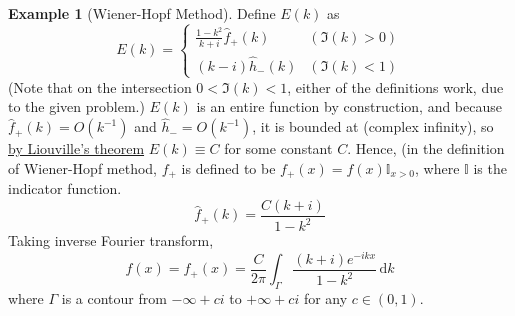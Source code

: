 \documentclass[a4paper, 12pt]{article}
\theoremstyle{definition}
\newtheorem{example}{Example}
\numberwithin{theorem}{section}
\numberwithin{definition}{section}
\numberwithin{exercise}{section}
\numberwithin{remark}{section}
\numberwithin{figure}{section}
\numberwithin{example}{section}
\newcommand{\intd}{\,\text{d}}
\begin{document}
\begin{example}[Wiener-Hopf Method]
    Define $E(k)$ as
    \begin{equation*}
        E(k) = 
        \begin{cases}
            \frac{1-k^2}{k+i} \hat f_{+} (k) & (\Im (k) > 0) \\
            (k-i) \hat h_{-}(k) & (\Im (k) < 1)
        \end{cases}
    \end{equation*}
    (Note that on the intersection $0 < \Im (k) < 1$, either of the definitions work,
    due to the given problem.)
    $E(k)$ is an entire function by construction, and because $\hat f_{+} (k) = O\left( k^{-1} \right)$ and $\hat h_{-} = O\left( k^{-1} \right)$,
    it is bounded at (complex infinity),
    so \ul{by Liouville's theorem} $E(k) \equiv C$ for some constant $C$.
    Hence, (in the definition of Wiener-Hopf method, $f_{+}$ is defined to be $f_{+}(x) = f(x) \mathbb{I}_{x>0}$, where $\mathbb{I}$ is the indicator function.
    \begin{equation*}
        \hat f_{+}(k) = \frac{C\left( k+i \right)}{1-k^2}
    \end{equation*}
    Taking inverse Fourier transform,
    \begin{equation*}
        f(x) = f_{+} (x) = \frac{C}{2\pi} \int_{\Gamma} \frac{\left( k+i \right)e^{-ikx}}{1-k^2} \intd k
    \end{equation*}
    where $\Gamma$ is a contour from $-\infty + ci$ to $+\infty + ci$ for any $c \in \left( 0,1 \right)$.

\end{example}
\end{document}
